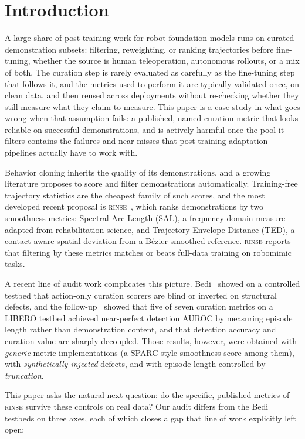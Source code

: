 \documentclass{article}
\newcommand{\rinse}{\textsc{rinse}}
\begin{document}
\section{Introduction}

A large share of post-training work for robot foundation models runs on
curated demonstration subsets: filtering, reweighting, or ranking
trajectories before fine-tuning, whether the source is human teleoperation,
autonomous rollouts, or a mix of both. The curation step is rarely evaluated
as carefully as the fine-tuning step that follows it, and the metrics used
to perform it are typically validated once, on clean data, and then reused
across deployments without re-checking whether they still measure what they
claim to measure. This paper is a case study in what goes wrong when that
assumption fails: a published, named curation metric that looks reliable on
successful demonstrations, and is actively harmful once the pool it filters
contains the failures and near-misses that post-training adaptation
pipelines actually have to work with.

Behavior cloning inherits the quality of its demonstrations, and a growing
literature proposes to score and filter demonstrations automatically.
Training-free trajectory statistics are the cheapest family of such scores,
and the most developed recent proposal is \rinse{}~\citep{rinse}, which ranks
demonstrations by two smoothness metrics: Spectral Arc Length (SAL), a
frequency-domain measure adapted from rehabilitation science, and
Trajectory-Envelope Distance (TED), a contact-aware spatial deviation from a
B\'ezier-smoothed reference. \rinse{} reports that filtering by these metrics
matches or beats full-data training on robomimic tasks.

A recent line of audit work complicates this picture.
Bedi~\citep{bedi-audit} showed on a controlled testbed that action-only
curation scorers are blind or inverted on structural defects, and the
follow-up~\citep{bedi-policy} showed that five of seven curation metrics on a
LIBERO testbed achieved near-perfect detection AUROC by measuring episode
length rather than demonstration content, and that detection accuracy and
curation value are sharply decoupled. Those results, however, were obtained
with \emph{generic} metric implementations (a SPARC-style smoothness score
among them), with \emph{synthetically injected} defects, and with episode
length controlled by \emph{truncation}.

This paper asks the natural next question: do the specific, published metrics
of \rinse{} survive these controls on real data? Our audit differs from the
Bedi testbeds on three axes, each of which closes a gap that line of work
explicitly left open:
\end{document}
